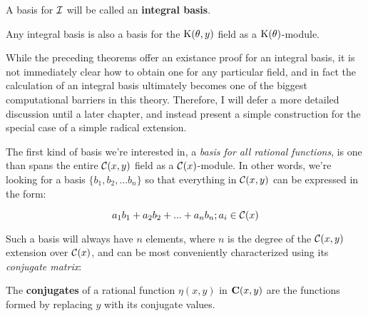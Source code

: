 
A basis for ${\cal I}$ will be called an {\bf integral basis}.

\enddefinition

\theorem

Any integral basis is also a basis for the ${\rm K}(\theta,y)$ field as a
${\rm K}(\theta)$-module.

\endtheorem

While the preceding theorems offer an existance proof for an integral
basis, it is not immediately clear how to obtain one for any
particular field, and in fact the calculation of an integral basis
ultimately becomes one of the biggest computational barriers in this
theory.  Therefore, I will defer a more detailed discussion until a
later chapter, and instead present a simple construction for the
special case of a simple radical extension.

%
%
%
%
%
%
%
%
%


The first kind of basis we're interested in, a {\it basis for all
rational functions}, is one than spans the entire ${\cal C}(x,y)$ field
as a ${\cal C}(x)$-module.
In other words, we're looking for a basis $\{b_1, b_2,
... b_n\}$ so that everything in ${\cal C}(x,y)$ can be expressed
in the form:

	$$ a_1 b_1 + a_2 b_2 + ... + a_n b_n; a_i \in {\cal C}(x) $$

Such a basis will always have $n$ elements, where $n$ is the degree of
the ${\cal C}(x,y)$ extension over ${\cal C}(x)$, and can be most
conveniently characterized using its {\it conjugate matrix}:


The {\bf conjugates} of a rational function $\eta(x,y)$ in ${\bf
C}(x,y)$ are the functions formed by replacing $y$ with its conjugate
values.

